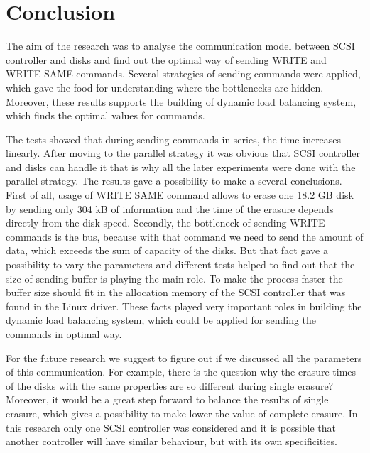 \chapter{Conclusion}
\label{chap6:title}

The aim of the research was to analyse the communication model between SCSI controller and disks and find out the optimal way of sending WRITE and WRITE SAME commands. Several strategies of sending commands were applied, which gave the food for understanding where the bottlenecks are hidden. Moreover, these results supports the building of dynamic load balancing system, which finds the optimal values for commands.

The tests showed that during sending commands in series, the time increases linearly. After moving to the parallel strategy it was obvious that SCSI controller and disks can handle it that is why all the later experiments were done with the parallel strategy. The results gave a possibility to make a several conclusions. First of all, usage of WRITE SAME command allows to erase one 18.2 GB disk by sending only 304 kB of information and the time of the erasure depends directly from the disk speed. Secondly, the bottleneck of sending WRITE commands is the bus, because with that command we need to send the amount of data, which exceeds the sum of capacity of the disks. But that fact gave a possibility to vary the parameters and different tests helped to find out that the size of sending buffer is playing the main role. To make the process faster the buffer size should fit in the allocation memory of the SCSI controller that was found in the Linux driver. These facts played very important roles in building the dynamic load balancing system, which could be applied for sending the commands in optimal way.

For the future research we suggest to figure out if we discussed all the parameters of this communication. For example, there is the question why the erasure times of the disks with the same properties are so different during single erasure? Moreover, it would be a great step forward to balance the results of single erasure, which gives a possibility to make lower the value of complete erasure. In this research only one SCSI controller was considered and it is possible that another controller will have similar behaviour, but with its own specificities.